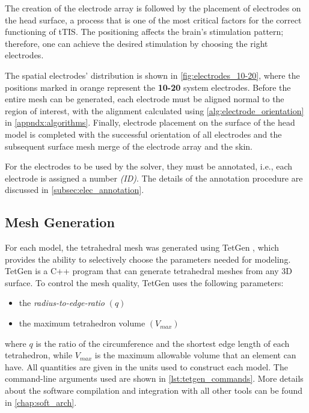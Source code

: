 The creation of the electrode array is followed by the placement of electrodes on the head surface, a process that is one of the most critical factors for the correct functioning of \gls{tTIS}. The positioning affects the brain's stimulation pattern; therefore, one can achieve the desired stimulation by choosing the right electrodes.

The spatial electrodes' distribution is shown in \autoref{fig:electrodes_10-20}, where the positions marked in orange represent the \textbf{10-20} system electrodes. Before the entire mesh can be generated, each electrode must be aligned normal to the region of interest, with the alignment calculated using \autoref{alg:electrode_orientation} in \autoref{appndx:algorithms}. Finally, electrode placement on the surface of the head model is completed with the successful orientation of all electrodes and the subsequent surface mesh merge of the electrode array and the skin.

For the electrodes to be used by the solver, they must be annotated, i.e., each electrode is assigned a number \textit{(ID)}. The details of the annotation procedure are discussed in \ref{subsec:elec_annotation}.

\subsection{Mesh Generation}
\label{subsec:mesh_generation}

For each model, the tetrahedral mesh was generated using TetGen \cite{tetgen}, which provides the ability to selectively choose the parameters needed for modeling. TetGen \cite{tetgen} is a C++ program that can generate tetrahedral meshes from any 3D surface. To control the mesh quality, TetGen \cite{tetgen} uses the following parameters:
\begin{itemize}
	\item the \textit{radius-to-edge-ratio} $(q)$
	\item the maximum tetrahedron volume $(V_{max})$
\end{itemize}
where $q$ is the ratio of the circumference and the shortest edge length of each tetrahedron, while $V_{max}$ is the maximum allowable volume that an element can have. All quantities are given in the units used to construct each model. The command-line arguments used are shown in \autoref{lst:tetgen_commands}. More details about the software compilation and integration with all other tools can be found in \autoref{chap:soft_arch}.

